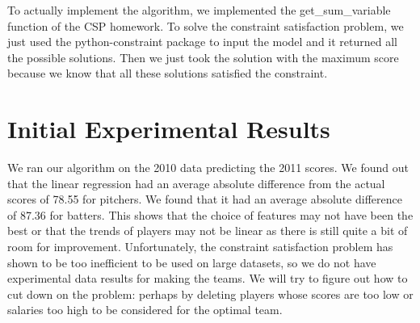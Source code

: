 \documentclass[12pt]{amsart}
\begin{document}
To actually implement the algorithm, we implemented the get\_sum\_variable function of the CSP homework. To solve the constraint satisfaction problem, we just used the python-constraint package to input the model and it returned all the possible solutions. Then we just took the solution with the maximum score because we know that all these solutions satisfied the constraint.
\section{\large Initial Experimental Results}
We ran our algorithm on the 2010 data predicting the 2011 scores. We found out that the linear regression had an average absolute difference from the actual scores of 78.55 for pitchers. We found that it had an average absolute difference of 87.36 for batters. This shows that the choice of features may not have been the best or that the trends of players may not be linear as there is still quite a bit of room for improvement. Unfortunately, the constraint satisfaction problem has shown to be too inefficient to be used on large datasets, so we do not have experimental data results for making the teams. We will try to figure out how to cut down on the problem: perhaps by deleting players whose scores are too low or salaries too high to be considered for the optimal team.
\end{document}
